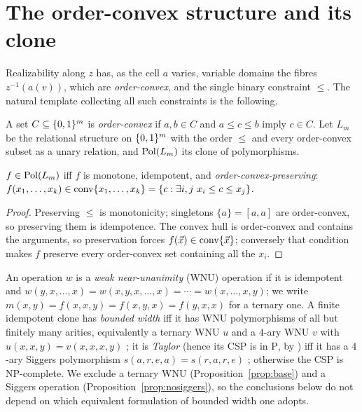 
\section{The order-convex structure and its clone}

Realizability along $z$ has, as the cell $a$ varies, variable domains
the fibres $z^{-1}(a(v))$, which are \emph{order-convex}, and the single
binary constraint $\le$.  The natural template collecting all such
constraints is the following.

\begin{defn}
  A set $C\subseteq\{0,1\}^m$ is \emph{order-convex} if $a,b\in C$ and $a\le
  c\le b$ imply $c\in C$.  Let $L_m$ be the relational structure on
  $\{0,1\}^m$ with the order $\le$ and every order-convex subset as a unary
  relation, and $\operatorname{Pol}(L_m)$ its clone of polymorphisms.
\end{defn}

\begin{lem}\label{lem:polchar}
  $f\in\operatorname{Pol}(L_m)$ iff $f$ is monotone, idempotent, and
  \emph{order-convex-preserving}: $f(x_1,\dots,x_k)\in\operatorname{conv}\{x_1,\dots,
  x_k\}=\{c:\exists i,j\ x_i\le c\le x_j\}$.
\end{lem}
\begin{proof}
  Preserving $\le$ is monotonicity; singletons $\{a\}=[a,a]$ are
  order-convex, so preserving them is idempotence.  The convex hull is
  order-convex and contains the arguments, so preservation forces
  $f(\vec x)\in\operatorname{conv}\{\vec x\}$; conversely that condition makes $f$
  preserve every order-convex set containing all the $x_i$.
\end{proof}

An operation $w$ is a \emph{weak near-unanimity} (WNU) operation if it is
idempotent and $w(y,x,\dots,x)=w(x,y,x,\dots,x)=\cdots=w(x,\dots,x,y)$; we
write $m(x,y)=f(x,x,y)=f(x,y,x)=f(y,x,x)$ for a ternary one.  A finite
idempotent clone has \emph{bounded width} iff it has WNU polymorphisms of
all but finitely many arities, equivalently a ternary WNU $u$ and a
$4$-ary WNU $v$ with $u(x,x,y)=v(x,x,x,y)$ \cite{BartoKozik,KKVW}; it is
\emph{Taylor} (hence its CSP is in $\mathrm P$, by \cite{Bulatov,Zhuk})
iff it has a $4$-ary Siggers polymorphism $s(a,r,e,a)=s(r,a,r,e)$
\cite{Siggers,KMM}; otherwise the CSP is $\mathrm{NP}$-complete.  We
exclude a ternary WNU (Proposition~\ref{prop:base}) and a Siggers
operation (Proposition~\ref{prop:nosiggers}), so the conclusions below do
not depend on which equivalent formulation of bounded width one adopts.

